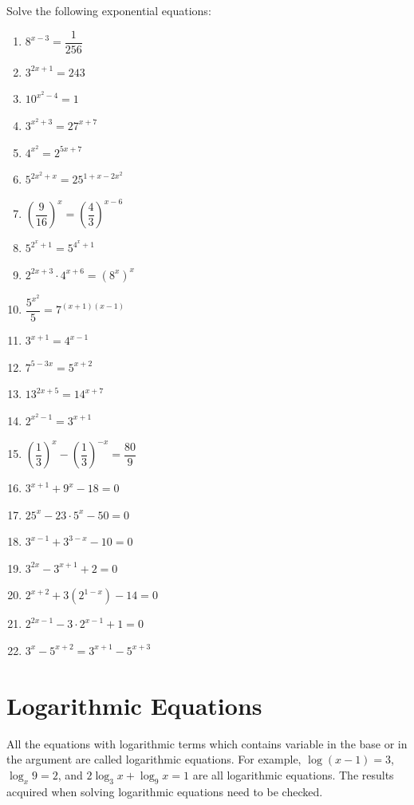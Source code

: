 \documentclass[12pt]{report}
\begin{document}
\setlength{\columnseprule}{1pt}
\setlength{\columnsep}{24pt}
\begin{multicols}{2}
  Solve the following exponential equations:

  \begin{enumerate}
    \item $8^{x-3}=\dfrac{1}{256}$
    \item $3^{2x+1}=243$
    \item $10^{x^{2}-4}=1$
    \item $3^{x^{2}+3}=27^{x+7}$
    \item $4^{x^{2}}=2^{5x+7}$
    \item $5^{2x^{2}+x}=25^{1+x-2x^{2}}$
    \item $\left({\dfrac{9}{16}}\right)^{x}=\left({\dfrac{4}{3}}\right)^{x-6}$
    \item $5^{2^x+1}=5^{4^x+1}$
    \item $2^{2x+3}\cdot4^{x+6}=\left(8^{x}\right)^{x}$
    \item ${\dfrac{5^{x^{2}}}{5}}=7^{(x+1)(x-1)}$
    \item $3^{x+1}=4^{x-1}$
    \item $7^{5-3x}=5^{x+2}$
    \item $13^{2x+5}=14^{x+7}$
    \item $2^{x^{2}-1}=3^{x+1}$
    \item $\left({\dfrac{1}{3}}\right)^{x}-\left({\dfrac{1}{3}}\right)^{-x}={\dfrac{80}{9}}$
    \item $3^{x+1}+9^{x}-18=0$
    \item $25^{x}-23\cdot5^{x}-50=0$
    \item $3^{x-1}+3^{3-x}-10=0$
    \item $3^{2x}-3^{x+1}+2=0$
    \item $2^{x+2}+3\left(2^{1-x}\right)-14=0$
    \item $2^{2x-1}-3\cdot2^{x-1}+1=0$
    \item $3^{x}-5^{x+2}=3^{x+1}-5^{x+3}$
  \end{enumerate}
\end{multicols}

\section{Logarithmic Equations}

All the equations with logarithmic terms which contains variable in the base or
in the argument are called logarithmic equations. For example, $\log(x-1) = 3$,
$\log_x 9 = 2$, and $2\log_3 x + \log_9 x = 1$ are all logarithmic equations.
The results acquired when solving logarithmic equations need to be checked.
\end{document}
